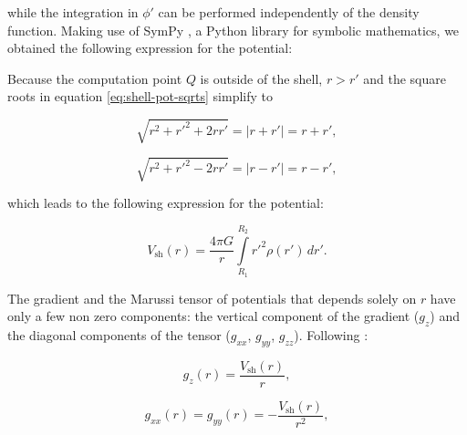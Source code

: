 \documentclass[extra, referee]{gji}
\begin{document}
\noindent
while the integration in $\phi'$ can be performed independently of the density function.
Making use of SymPy \citep{sympy2017}, a Python library for symbolic mathematics, we
obtained the following expression for the potential:


Because the computation point $Q$ is outside of the shell, $r > r'$ and the square roots
in equation \ref{eq:shell-pot-sqrts} simplify to

\begin{equation}
    \sqrt{r^2 + r'^2 + 2rr'} = |r + r'| = r + r',
\end{equation}

\begin{equation}
    \sqrt{r^2 + r'^2 - 2rr'} = |r - r'| = r - r',
\end{equation}

\noindent which leads to the following expression for the potential:

\begin{equation}
    V_\text{sh}(r) = \frac{4\pi G}{r}
    \int\limits_{R_1}^{R_2} {r'}^2 \rho(r') \, dr'.
\label{eq:shell-pot}
\end{equation}

The gradient and the Marussi tensor of potentials that
depends solely on $r$ have only a few non zero components: the vertical
component of the gradient ($g_z$) and the diagonal components of the
tensor ($g_{xx}$, $g_{yy}$, $g_{zz}$).
Following \citet{Grombein2013}:

\begin{equation}
    g_z(r) = \frac{V_\text{sh}(r)}{r},
\end{equation}

\begin{equation}
    g_{xx}(r) = g_{yy}(r) = -\frac{V_\text{sh}(r)}{r^2},
\end{equation}
\end{document}

